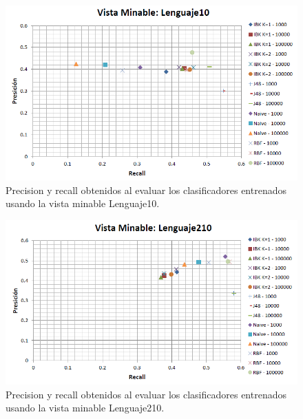 \documentclass{article}
\begin{document}
\begin{figure}[!htb]
\begin{centering}
\includegraphics[scale=0.8]{lenguaje10}
\par\end{centering}
\caption{Precision y recall obtenidos al evaluar los clasificadores entrenados usando la vista minable Lenguaje10.}
\label{fig:figura6}
\end{figure}

\begin{figure}[!htb]
\begin{centering}
\includegraphics[scale=0.8]{lenguaje210}
\par\end{centering}
\caption{Precision y recall obtenidos al evaluar los clasificadores entrenados usando la vista minable Lenguaje210.}
\label{fig:figura7}
\end{figure}
\end{document}
